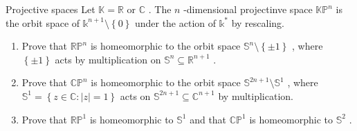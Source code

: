 \documentclass[../main.tex]{subfiles}
\begin{document}
\begin{problem}{Projective spaces}{}
    Let \(  \mathbb{K}= \mathbb{R}  \) or \(  \mathbb{C}  \) . The \(   n  \) -dimensional projectinve space \(  \mathbb{KP}^{n}  \) is the orbit space of \(  \mathbb{k}^{n+ 1}\setminus \left\{ 0 \right\}   \) under the action of \(  \mathbb{k}^{*}  \) by rescaling. 
    \begin{enumerate}
        \item Prove that \(  \mathbb{RP}^{n}  \) is homeomorphic to the orbit space \(  \mathbb{S}^{n} \setminus \left\{ \pm 1 \right\}  \) , where \(  \left\{ \pm 1 \right\}   \) acts by multiplication on \(  \mathbb{S}^{n}\subseteq \mathbb{R} ^{n+ 1}  \) . 
        \item Prove that \(  \mathbb{CP}^{n}  \) is homeomorphic to the orbit space \(  \mathbb{S}^{2n+ 1} \setminus  \mathbb{S}^{1}  \) , where \(  \mathbb{S}^{1}= \left\{ z \in \mathbb{C}  : \left| z \right|= 1 \right\}  \) acts on \(  \mathbb{S}^{2n+ 1} \subseteq \mathbb{C}^{n+ 1}  \) by multiplication. 
        \item Prove that \(  \mathbb{RP}^{1}  \) is homeomorphic to \(  \mathbb{S}^{1}  \) and that \(  \mathbb{CP}^{1}  \) is homeomorphic to \(  \mathbb{S}^{2}  \) .             
    \end{enumerate}
           
\end{problem}
\end{document}
